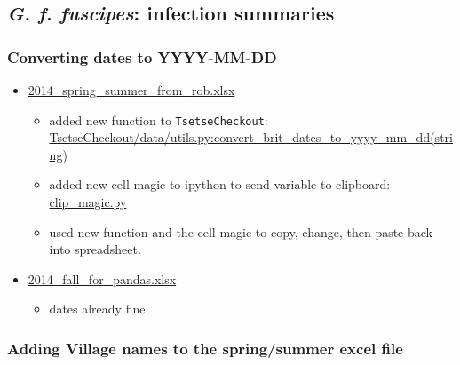 \documentclass[letterpaper]{scrartcl}
\begin{document}
\subsection{\emph{G. f. fuscipes}: infection
summaries}\label{g.-f.-fuscipes-infection-summaries-1}

\subsubsection{Converting dates to
YYYY-MM-DD}\label{converting-dates-to-yyyy-mm-dd}

\begin{itemize}
\itemsep1pt\parskip0pt
\item
  \href{file:///home/gus/Documents/YalePostDoc/project_stuff/g_f_fucipes_uganda/collection_data/2014_spring_summer_from_rob.xlsx}{2014\_spring\_summer\_from\_rob.xlsx}

  \begin{itemize}
  \itemsep1pt\parskip0pt
  \item
    added new function to
    \texttt{TsetseCheckout}:\\\href{file:///home/gus/Dropbox/repos/git/TsetseCheckout/TsetseCheckout/data/utils.py}{TsetseCheckout/data/utils.py:convert\_brit\_dates\_to\_yyyy\_mm\_dd(string)}
  \item
    added new cell magic to ipython to send variable to
    clipboard:\\\href{https://gist.github.com/xguse/a01780ef22cfad8adaf9}{clip\_magic.py}
  \item
    used new function and the cell magic to copy, change, then paste
    back into spreadsheet.
  \end{itemize}
\item
  \href{file:///home/gus/Documents/YalePostDoc/project_stuff/g_f_fucipes_uganda/collection_data/2014_fall_for_pandas.xlsx}{2014\_fall\_for\_pandas.xlsx}

  \begin{itemize}
  \itemsep1pt\parskip0pt
  \item
    dates already fine
  \end{itemize}
\end{itemize}

\subsubsection{Adding Village names to the spring/summer excel
file}\label{adding-village-names-to-the-springsummer-excel-file}
\end{document}
